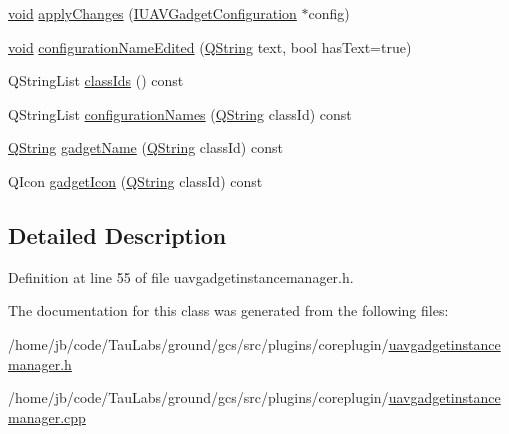 \begin{DoxyCompactItemize}
\item 
\hyperlink{group___u_a_v_objects_plugin_ga444cf2ff3f0ecbe028adce838d373f5c}{void} \hyperlink{group___core_plugin_ga7cd1bf8e5387d0c7cff1d5696266ddbb}{apply\-Changes} (\hyperlink{class_core_1_1_i_u_a_v_gadget_configuration}{\-I\-U\-A\-V\-Gadget\-Configuration} $\ast$config)
\item 
\hyperlink{group___u_a_v_objects_plugin_ga444cf2ff3f0ecbe028adce838d373f5c}{void} \hyperlink{group___core_plugin_gafeb0a97fb20b6ddce2b951535339645e}{configuration\-Name\-Edited} (\hyperlink{group___u_a_v_objects_plugin_gab9d252f49c333c94a72f97ce3105a32d}{\-Q\-String} text, bool has\-Text=true)
\item 
\-Q\-String\-List \hyperlink{group___core_plugin_gab697e11f053f6a4e76f749a6aec7a7e9}{class\-Ids} () const 
\item 
\-Q\-String\-List \hyperlink{group___core_plugin_gadbf383c414223932af4f4a542dcc1005}{configuration\-Names} (\hyperlink{group___u_a_v_objects_plugin_gab9d252f49c333c94a72f97ce3105a32d}{\-Q\-String} class\-Id) const 
\item 
\hyperlink{group___u_a_v_objects_plugin_gab9d252f49c333c94a72f97ce3105a32d}{\-Q\-String} \hyperlink{group___core_plugin_gadc1d815c499816d254ba28f10bfcc382}{gadget\-Name} (\hyperlink{group___u_a_v_objects_plugin_gab9d252f49c333c94a72f97ce3105a32d}{\-Q\-String} class\-Id) const 
\item 
\-Q\-Icon \hyperlink{group___core_plugin_ga9fdb135aaf62b1ebefb587934d545b3d}{gadget\-Icon} (\hyperlink{group___u_a_v_objects_plugin_gab9d252f49c333c94a72f97ce3105a32d}{\-Q\-String} class\-Id) const 
\end{DoxyCompactItemize}


\subsection{\-Detailed \-Description}


\-Definition at line 55 of file uavgadgetinstancemanager.\-h.



\-The documentation for this class was generated from the following files\-:\begin{DoxyCompactItemize}
\item 
/home/jb/code/\-Tau\-Labs/ground/gcs/src/plugins/coreplugin/\hyperlink{uavgadgetinstancemanager_8h}{uavgadgetinstancemanager.\-h}\item 
/home/jb/code/\-Tau\-Labs/ground/gcs/src/plugins/coreplugin/\hyperlink{uavgadgetinstancemanager_8cpp}{uavgadgetinstancemanager.\-cpp}\end{DoxyCompactItemize}

